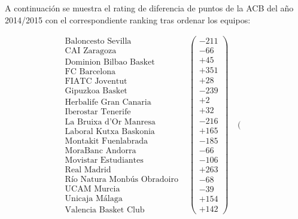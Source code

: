 \begin{ejem} A continuación se muestra el rating de diferencia de puntos de la ACB del año 2014/2015 con el correspondiente ranking tras ordenar los equipos:
\end{ejem}	
	$$\begin{array}{ccc}
	\begin{array}{c}
	\text{Baloncesto Sevilla}\\
	\text{CAI Zaragoza} \\
	\text{Dominion Bilbao Basket} \\
	\text{FC Barcelona} \\
	\text{FIATC Joventut} \\
	\text{Gipuzkoa Basket} \\
	\text{Herbalife Gran Canaria} \\
	\text{Iberostar Tenerife} \\
	\text{La Bruixa d'Or Manresa} \\
	\text{Laboral Kutxa Baskonia} \\
	\text{Montakit Fuenlabrada} \\
	\text{MoraBanc Andorra} \\
	\text{Movistar Estudiantes} \\
	\text{Real Madrid} \\
	\text{Río Natura Monbús Obradoiro} \\
	\text{UCAM Murcia} \\
	\text{Unicaja Málaga} \\
	\text{Valencia Basket Club}	
	\end{array} & \left(\begin{array}{c}
	-211\\
	-66\\
	+45\\
	+351\\
	+28\\
	-239\\
	+2\\
	+32\\
	-216\\
	+165\\
	-185\\
	-66\\
	-106\\
	+263\\
	-68\\
	-39\\
	+154\\
	+142
	\end{array} \right) & \left(\begin{array}{c}

\end{array}
\end{array}$$
